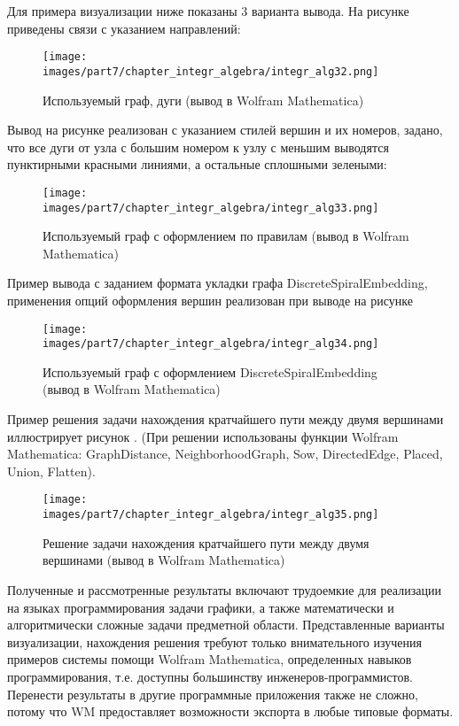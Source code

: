 Для примера визуализации ниже показаны 3 варианта вывода. На рисунке \textit{} приведены связи с указанием направлений:
\begin{figure}[h]
	\centering
	\texttt{[image: images/part7/chapter\_integr\_algebra/integr\_alg32.png]}
	\caption{Используемый граф, дуги (вывод в Wolfram Mathematica)}
	\label{fig:integr_alg32}
\end{figure}

Вывод на рисунке \textit{} реализован с указанием стилей вершин и их номеров, задано, что все дуги от узла с большим номером к узлу с меньшим выводятся пунктирными красными линиями, а остальные сплошными зелеными:

\begin{figure}[h]
	\centering
	\texttt{[image: images/part7/chapter\_integr\_algebra/integr\_alg33.png]}
	\caption{Используемый граф с оформлением по правилам (вывод в Wolfram Mathematica)}
	\label{fig:integr_alg33}
\end{figure}

Пример вывода с заданием формата укладки графа DiscreteSpiralEmbedding, применения опций оформления вершин реализован при выводе на рисунке \textit{} 

\begin{figure}[h]
	\centering
	\texttt{[image: images/part7/chapter\_integr\_algebra/integr\_alg34.png]}
	\caption{Используемый граф с оформлением DiscreteSpiralEmbedding (вывод в Wolfram Mathematica)}
	\label{fig:integr_alg34}
\end{figure}

Пример решения задачи нахождения кратчайшего пути между двумя вершинами иллюстрирует рисунок \textit{}. (При решении использованы функции Wolfram Mathematica: GraphDistance, NeighborhoodGraph, Sow, DirectedEdge, Placed, Union, Flatten).

\begin{figure}[h]
	\centering
	\texttt{[image: images/part7/chapter\_integr\_algebra/integr\_alg35.png]}
	\caption{Решение задачи нахождения кратчайшего пути между двумя вершинами (вывод в Wolfram Mathematica)}
	\label{fig:integr_alg35}
\end{figure}

Полученные и рассмотренные результаты включают трудоемкие для реализации на языках программирования задачи графики, а также математически и алгоритмически сложные задачи предметной области. Представленные варианты визуализации, нахождения решения требуют только внимательного изучения примеров системы помощи Wolfram Mathematica, определенных навыков программирования, т.е. доступны большинству инженеров-программистов. Перенести результаты в другие программные приложения также не сложно, потому что WM предоставляет возможности экспорта в любые типовые форматы.

